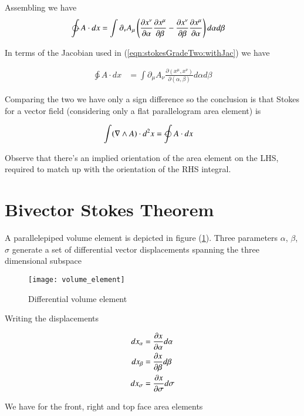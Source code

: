 Assembling we have
\begin{align*}
\ointctrclockwise 
A \cdot dx
&=
\int
\partial_\nu A_\mu \left( \PD{\alpha}{x^\nu} \PD{\beta}{x^\mu} - \PD{\beta}{x^\nu} \PD{\alpha}{x^\mu} \right) d\alpha d\beta
\end{align*}

In terms of the Jacobian used in (\ref{eqn:stokesGradeTwo:withJac}) we have

\begin{align*}
\ointctrclockwise 
A \cdot dx &= \int \partial_\mu A_\nu \frac{\partial (x^\mu, x^\nu)}{\partial (\alpha, \beta)} d\alpha d\beta
\end{align*}

Comparing the two we have only a sign difference so the conclusion is that Stokes for a vector field (considering only a flat parallelogram area element) is

\begin{align}
\int ( \grad \wedge A ) \cdot d^2 x &= \ointclockwise A \cdot dx
\end{align}

Observe that there's an implied orientation of the area element on the LHS, required to match up with the orientation of the RHS integral.

\section{Bivector Stokes Theorem}

A parallelepiped volume element is depicted in figure (\ref{fig:volume_element}).  Three parameters $\alpha$, $\beta$, $\sigma$ generate a set of differential vector displacements spanning the three dimensional subspace

\begin{figure}[htp]
\centering
\texttt{[image: volume\_element]}
\caption{Differential volume element}\label{fig:volume_element}
\end{figure}

Writing the displacements 

\begin{align*}
dx_\alpha &= \frac{\partial {x}}{\partial {\alpha}} d\alpha \\
dx_\beta &= \frac{\partial {x}}{\partial {\beta}} d\beta \\
dx_\sigma &= \frac{\partial {x}}{\partial {\sigma}} d\sigma
\end{align*}

We have for the front, right and top face area elements 

